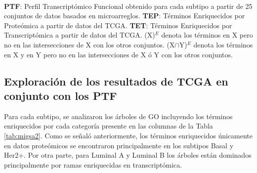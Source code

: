 \documentclass[12pt,twoside]{reedthesis}
\begin{document}
\begin{table}[!h]
  \caption{Número de términos enriquecidos compartidos entre plataformas y múltiples ómicas para cada subtipo.}
  \label{tab:migsa2}
  \\ \textbf{PTF}: Perfil Transcriptómico Funcional obtenido para cada subtipo a partir de 25 conjuntos de datos basados en microarreglos. \textbf{TEP}: Términos Enriquecidos por Proteómica a partir de datos del TCGA. \textbf{TET}: Términos Enriquecidos por Transcriptómica a partir de datos del TCGA. (X)$^E$ denota los términos en X pero no en las intersecciones de X con los otros conjuntos. (X$\cap$Y)$^E$ denota los términos en X y en Y pero no en las intersecciones de X ó Y con los otros conjuntos.
\end{table}
\hypertarget{exploracion-de-los-resultados-de-tcga-en-conjunto-con-los-ptf}{%
\subsection{Exploración de los resultados de TCGA en conjunto con los PTF}\label{exploracion-de-los-resultados-de-tcga-en-conjunto-con-los-ptf}}

\par

Para cada subtipo, se analizaron los árboles de GO incluyendo los términos enriquecidos por cada categoría presente en las columnas de la Tabla \ref{tab:migsa2}. Como se señaló anteriormente, los términos enriquecidos únicamente en datos proteómicos se encontraron principalmente en los subtipos Basal y Her2+. Por otra parte, para Luminal A y Luminal B los árboles están dominados principalmente por ramas enriquecidas en transcriptómica.
\end{document}

